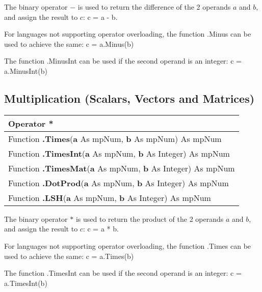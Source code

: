 \vspace{0.3cm}
The binary operator $-$ is used to return the difference of the 2 operands $a$ and $b$, and assign the result to $c$: \textsf{c = a - b}.

For languages not supporting operator overloading, the function \textsf{.Minus} can be used to achieve the same: \textsf{c = a.Minus(b)}

The function \textsf{.MinusInt}  can be used if the second operand is an integer: \textsf{c = a.MinusInt(b)}






\subsection{Multiplication (Scalars, Vectors and Matrices)}
\begin{tabular}{p{481pt}}
	\toprule
	\textsf{Operator \textbf{*}}\index{Multiprecision Functions!*} \\
	\midrule
	\textsf{Function \textbf{.Times}(\textbf{a} As mpNum, \textbf{b} As mpNum) As mpNum}\index{Multiprecision Functions!.Times} \\
	\textsf{Function \textbf{.TimesInt}(\textbf{a} As mpNum, \textbf{b} As Integer) As mpNum}\index{Multiprecision Functions!.TimesInt} \\
	
	\textsf{Function \textbf{.TimesMat}(\textbf{a} As mpNum, \textbf{b} As Integer) As mpNum}\index{Multiprecision Functions!.TimesMat} \\
	\textsf{Function \textbf{.DotProd}(\textbf{a} As mpNum, \textbf{b} As Integer) As mpNum}\index{Multiprecision Functions!.DotProd} \\
	\textsf{Function \textbf{.LSH}(\textbf{a} As mpNum, \textbf{b} As Integer) As mpNum}\index{Multiprecision Functions!.LSH} \\
	
	\bottomrule
\end{tabular}

\vspace{0.3cm}
The binary operator $*$ is used to return the product of the 2 operands $a$ and $b$, and assign the result to $c$: \textsf{c = a * b}.

For languages not supporting operator overloading, the function \textsf{.Times} can be used to achieve the same: \textsf{c = a.Times(b)}

The function \textsf{.TimesInt}  can be used if the second operand is an integer: \textsf{c = a.TimesInt(b)}






